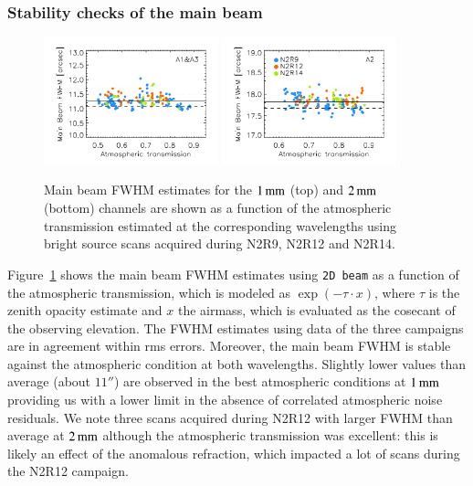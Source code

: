 \subsubsection{Stability checks of the main beam}
\label{se:mainbeam_stability}

\begin{figure}[!thbp]
\begin{center}
  \includegraphics[clip, width=0.45\textwidth]{Figures/plot_FWHM_vs_atmtrans_mb_radius_binning2_1mm.pdf}
  \includegraphics[clip, width=0.45\textwidth]{Figures/plot_FWHM_vs_atmtrans_mb_radius_binning2_a2.pdf}
  \caption[Main Beam FWHM]{Main beam FWHM estimates for the
    $1\,\rm{mm}$ (top) and $2\,\rm{mm}$ (bottom) channels are shown as
    a function of the atmospheric transmission estimated at the
    corresponding wavelengths using bright source scans acquired during N2R9, N2R12 and N2R14. }
\label{fig:fwhm_map_atmtrans}
\end{center}
\end{figure}

Figure~\ref{fig:fwhm_map_atmtrans} shows the main beam FWHM estimates
using {\tt 2D beam} as a function of the atmospheric transmission,
which is modeled as $\exp{\left(-\tau \cdot x\right)}$, where $\tau$
is the zenith opacity estimate and
$x$ the airmass, which is evaluated as the cosecant of the observing
elevation. The FWHM estimates using data of the three campaigns are in
agreement within rms errors. Moreover, the main beam FWHM is stable
against the atmospheric condition at both wavelengths. Slightly lower
values than average (about $11''$) are observed in the best
atmospheric conditions at $1\,\rm{mm}$ providing us with a lower limit
in the absence of correlated atmospheric noise residuals. We note
three scans acquired during N2R12 with larger FWHM than average at
$2\,\rm{mm}$ although the atmospheric transmission was excellent: this
is likely an effect of the anomalous refraction, which impacted
a lot of scans during the N2R12 campaign. 



